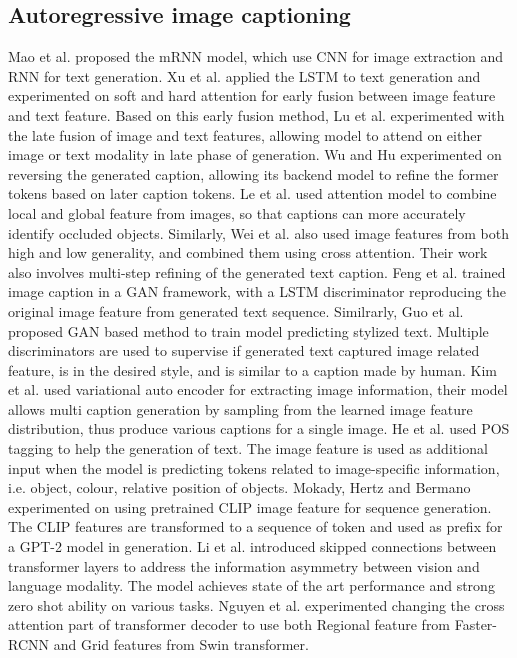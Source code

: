 \documentclass{article}
\begin{document}
\subsection{Autoregressive image captioning}
Mao et al. proposed the mRNN model\cite{https://doi.org/10.48550/arxiv.1412.6632}, which use CNN for image extraction and RNN for text generation. Xu et al. \cite{DBLP:journals/corr/XuBKCCSZB15} applied the LSTM to text generation and experimented on soft and hard attention for early fusion between image feature and text feature. Based on this early fusion method, Lu et al. \cite{DBLP:journals/corr/LuXPS16} experimented with the late fusion of image and text features, allowing model to attend on either image or text modality in late phase of generation. Wu and Hu \cite{cascade-RNN} experimented on reversing the generated caption, allowing its backend model to refine the former tokens based on later caption tokens. Le et al. \cite{gla} used attention model to combine local and global feature from images, so that captions can more accurately identify occluded objects. Similarly, Wei et al. \cite{stack-vs} also used image features from both high and low generality, and combined them using cross attention. Their work also involves multi-step refining of the generated text caption. Feng et al. \cite{DBLP:journals/corr/abs-1811-10787} trained image caption in a GAN framework, with a LSTM discriminator reproducing the original image feature from generated text sequence. Similrarly, Guo et al. \cite{mscap} proposed GAN based method to train model predicting stylized text. Multiple discriminators are used to supervise if generated text captured image related feature, is in the desired style, and is similar to a caption made by human. Kim et al. \cite{vae-caption} used variational auto encoder for extracting image information, their model allows multi caption generation by sampling from the learned image feature distribution, thus produce various captions for a single image. He et al. \cite{image-caption-with-pos} used POS tagging to help the generation of text. The image feature is used as additional input when the model is predicting tokens related to image-specific information, i.e. object, colour, relative position of objects. Mokady, Hertz and Bermano \cite{clipcap} experimented on using pretrained CLIP image feature for sequence generation. The CLIP features are transformed to a sequence of token and used as prefix for a GPT-2 model in generation. Li et al. \cite{mplug} introduced skipped connections between transformer layers to address the information asymmetry between vision and language modality. The model achieves state of the art performance and strong zero shot ability on various tasks. Nguyen et al. \cite{grit} experimented changing the cross attention part of transformer decoder to use both Regional feature from Faster-RCNN\cite{faster-rcnn} and Grid features from Swin transformer\cite{swin}. 
\end{document}
